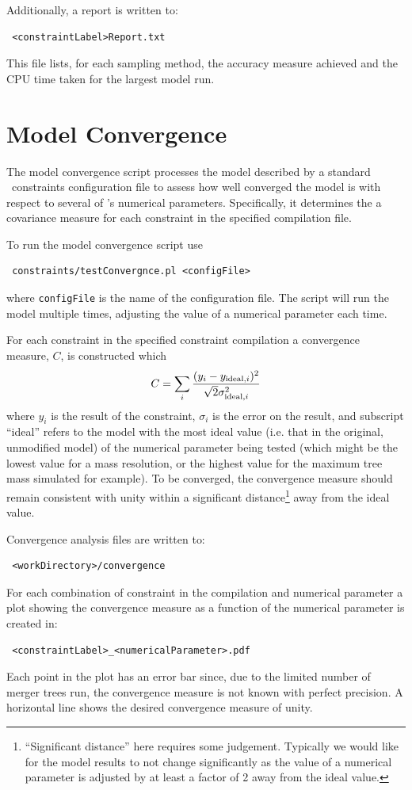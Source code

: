 Additionally, a report is written to:
\begin{verbatim}
 <constraintLabel>Report.txt
\end{verbatim}
This file lists, for each sampling method, the accuracy measure achieved and the CPU time taken for the largest model run.

\section{Model Convergence}\label{sec:ModelConvergence}

The model convergence script processes the model described by a standard \glc\ constraints configuration file to assess how well converged the model is with respect to several of \glc's numerical parameters. Specifically, it determines the a covariance measure for each constraint in the specified compilation file.

To run the model convergence script use
\begin{verbatim}
 constraints/testConvergnce.pl <configFile>
\end{verbatim}
where {\tt configFile} is the name of the configuration file. The script will run the model multiple times, adjusting the value of a numerical parameter each time.

For each constraint in the specified constraint compilation a convergence measure, $C$, is constructed which
\begin{equation}
 C = \sum_i {(y_i - y_{{\rm ideal}, i})^2 \over \sqrt{2} \sigma_{{\rm ideal}, i}^2}
\end{equation}
where $y_i$ is the result of the constraint, $\sigma_i$ is the error on the result, and subscript ``ideal'' refers to the model with the most ideal value (i.e. that in the original, unmodified model) of the numerical parameter being tested (which might be the lowest value for a mass resolution, or the highest value for the maximum tree mass simulated for example). To be converged, the convergence measure should remain consistent with unity within a significant distance\footnote{``Significant distance'' here requires some judgement. Typically we would like for the model results to not change significantly as the value of a numerical parameter is adjusted by at least a factor of 2 away from the ideal value.} away from the ideal value.

Convergence analysis files are written to:
\begin{verbatim}
 <workDirectory>/convergence
\end{verbatim}
For each combination of constraint in the compilation and numerical parameter a plot showing the convergence measure as a function of the numerical parameter is created in:
\begin{verbatim}
 <constraintLabel>_<numericalParameter>.pdf
\end{verbatim}
Each point in the plot has an error bar since, due to the limited number of merger trees run, the convergence measure is not known with perfect precision. A horizontal line shows the desired convergence measure of unity.

